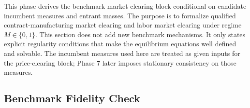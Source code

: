 








































































This phase derives the benchmark market-clearing block conditional on candidate incumbent measures and entrant masses. The purpose is to formalize qualified contract-manufacturing market clearing and labor market clearing under regime $M\in\{0,1\}$. This section does not add new benchmark mechanisms. It only states explicit regularity conditions that make the equilibrium equations well defined and solvable. The incumbent measures used here are treated as given inputs for the price-clearing block; Phase 7 later imposes stationary consistency on those measures.

\subsection{Benchmark Fidelity Check}

